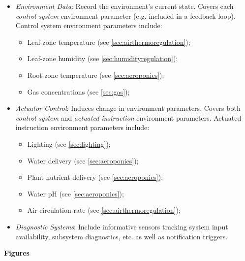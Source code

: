 \begin{itemize}
    \item \textit{Environment Data}: Record the environment's current state. Covers each \textit{control system} environment parameter (e.g. included in a feedback loop). Control system environment parameters include:
    \begin{itemize}
        \item Leaf-zone temperature (see \ref{sec:airthermoregulation});
        \item Leaf-zone humidity (see \ref{sec:humidityregulation});
        \item Root-zone temperature (see \ref{sec:aeroponics});
        \item Gas concentrations (see \ref{sec:gas});
    \end{itemize}
    \item \textit{Actuator Control}: Induces change in environment parameters. Covers both \textit{control system} and \textit{actuated instruction} environment parameters. Actuated instruction environment parameters include:
    \begin{itemize}
        \item Lighting (see \ref{sec:lighting});
        \item Water delivery (see \ref{sec:aeroponics});
        \item Plant nutrient delivery (see \ref{sec:aeroponics});
        \item Water pH (see \ref{sec:aeroponics});
        \item Air circulation rate (see \ref{sec:airthermoregulation});
    \end{itemize}
    \item \textit{Diagnostic Systems}: Include informative sensors tracking system input availability, subsystem diagnostics, etc. as well as notification triggers.
\end{itemize}

\clearpage

\textbf{Figures}

